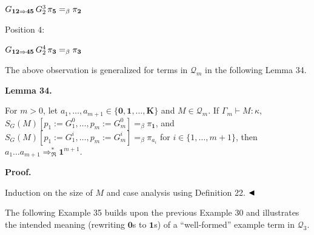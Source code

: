$G_{\mathbf{1}\mathbf{2}\Rightarrow\mathbf{4}\mathbf{5}}\,G_{2}^{3}\,\pi_{%
\mathbf{5}}=_{\beta}\pi_{\mathbf{2}}$\par
 
  Position $4$:  
 
$G_{\mathbf{1}\mathbf{2}\Rightarrow\mathbf{4}\mathbf{5}}\,G_{2}^{4}\,\pi_{%
\mathbf{3}}=_{\beta}\pi_{\mathbf{3}}$\par
 
   
 
 
 
The above observation is generalized for terms in $\mathcal{Q}_{m}$ in the following Lemma 34.\par
 
 
 
\par\medskip\noindent\textbf{Lemma 34.}\par
 
 
For $m>0$, let $a_{1},\ldots,a_{m+1}\in\{\mathbf{0},\mathbf{1},\ldots,\mathbf{K}\}$ and $M\in\mathcal{Q}_{m}$. If $\Gamma_{m}\vdash M:\kappa$, $S_{G}(M)[p_{1}:=G_{1}^{0},\ldots,p_{m}:=G_{m}^{0}]=_{\beta}\pi_{\mathbf{1}}$, and $S_{G}(M)[p_{1}:=G_{1}^{i},\ldots,p_{m}:=G_{m}^{i}]=_{\beta}\pi_{a_{i}}$ for $i\in\{1,\ldots,m+1\}$, then $a_{1}\ldots a_{m+1}\Rightarrow_{\mathfrak{R}}^{*}\mathbf{1}^{m+1}$.\par
 
 
 
 
\par\medskip\noindent\textbf{Proof.}\par
 
 
Induction on the size of $M$ and case analysis using Definition 22. $\hfill\blacktriangleleft$\par
 
 
 
The following Example 35 builds upon the previous Example 30 and illustrates the intended meaning (rewriting $\mathbf{0}$s to $\mathbf{1}$s) of a “well-formed” example term in $\mathcal{Q}_{3}$.\par
 

